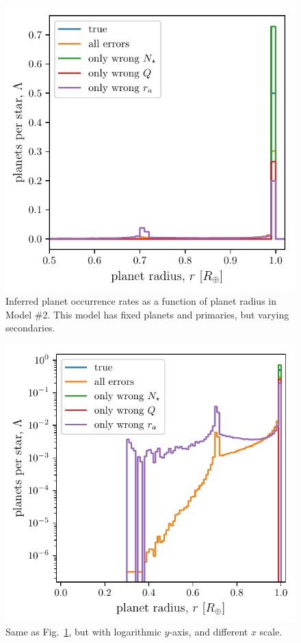 \begin{figure}[!tb]
    \centering
    \includegraphics[width=.7\textwidth]{figures/errcases_rate_density_vs_radius_model_2.pdf}
    \caption{
    Inferred planet occurrence rates as a function of planet radius in Model 
    \#2.
    This model has fixed planets and primaries, but varying secondaries.
    }
    \label{fig:errcases_model_2_linear}
\end{figure}

\begin{figure}[!tb]
    \centering
    \includegraphics[width=.7\textwidth]{figures/errcases_rate_density_vs_radius_logs_model_2.pdf}
    \caption{
    Same as Fig.~\ref{fig:errcases_model_2_linear}, but with logarithmic 
    $y$-axis, and different $x$ scale.
    }
    \label{fig:errcases_model_2_log}
\end{figure}

